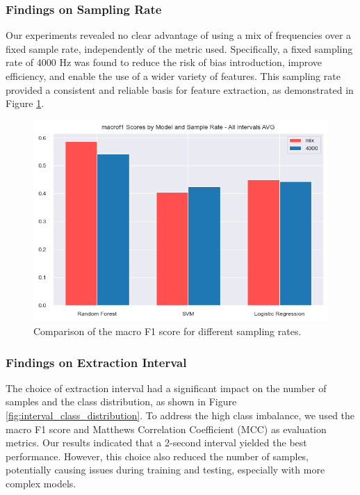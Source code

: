 \subsubsection{Findings on Sampling Rate}
Our experiments revealed no clear advantage of using a mix of frequencies over a fixed sample rate, independently of the metric used.
Specifically, a fixed sampling rate of 4000 Hz was found to reduce the risk of bias introduction, improve efficiency, 
and enable the use of a wider variety of features. This sampling rate provided a consistent and reliable basis 
for feature extraction, as demonstrated in Figure \ref{fig:sample_rate_impact}.

\begin{figure}[H]
    \centering
    \includegraphics[width=1\columnwidth]{./images/sample_rate_impact.png}
    \caption{Comparison of the macro F1 score for different sampling rates.}
    \label{fig:sample_rate_impact}
\end{figure}

\subsubsection{Findings on Extraction Interval}
The choice of extraction interval had a significant impact on the number of samples and the class distribution, as shown in Figure \ref{fig:interval_class_distribution}.
To address the high class imbalance, we used the macro F1 score and Matthews Correlation Coefficient (MCC) as evaluation metrics. 
Our results indicated that a 2-second interval yielded the best performance. However, this choice also reduced the number of samples, 
potentially causing issues during training and testing, especially with more complex models. 

